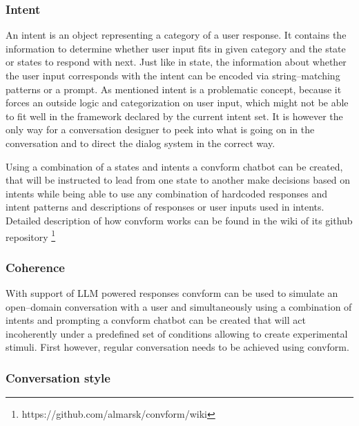 \documentclass[12pt]{report}
\begin{document}
{\subsubsection{Intent}
An intent is an object representing a category of a user response.
It contains the information to determine whether
user input fits in given category and
the state or states to respond with next.
Just like in state, the information about whether the user input
corresponds with the intent can be encoded via
string–matching patterns or a prompt.
As mentioned intent is a problematic concept,
because it forces an outside logic and categorization
on user input, which might not be able to fit well
in the framework declared by the current intent set.
It is however the only way for a conversation designer
to peek into what is going on in the conversation
and to direct the dialog system in the correct way.

\par
Using a combination of a states and intents a convform chatbot can be created,
that will be instructed to lead from one state to another
make decisions based on intents
while being able to use any combination of
hardcoded responses and intent patterns
and descriptions of responses or user inputs used in intents.
Detailed description of how convform works can be found
in the wiki of its github repository \footnote{https://github.com/almarsk/convform/wiki}

\subsubsection{Coherence}
With support of LLM powered responses
convform can be used to simulate
an open–domain conversation with a user
and simultaneously using a combination
of intents and prompting
a convform chatbot can be created
that will act incoherently under a predefined set of conditions
allowing to create experimental stimuli.
First however, regular conversation needs to be achieved using convform.

\subsubsection{Conversation style}

}
\end{document}
